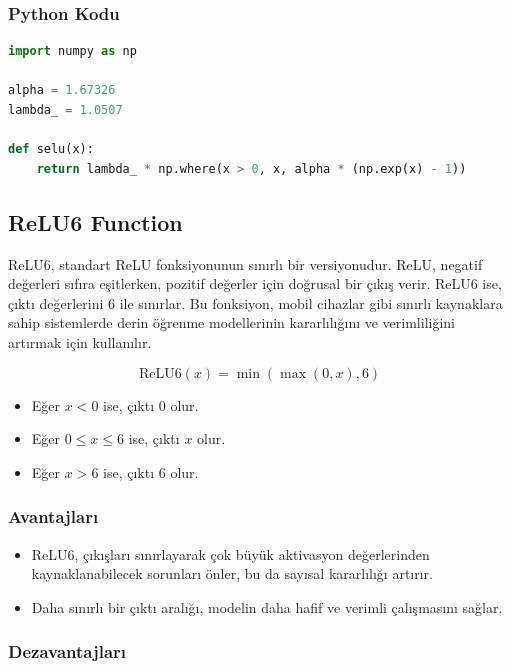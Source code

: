 \subsubsection{Python Kodu}

\begin{lstlisting}[language=Python]
import numpy as np

alpha = 1.67326
lambda_ = 1.0507

def selu(x):
    return lambda_ * np.where(x > 0, x, alpha * (np.exp(x) - 1))
\end{lstlisting}

\newpage

\subsection{ReLU6 Function}

ReLU6, standart ReLU fonksiyonunun sınırlı bir versiyonudur. ReLU, negatif değerleri sıfıra eşitlerken, pozitif değerler için doğrusal bir çıkış verir. ReLU6 ise, çıktı değerlerini 6 ile sınırlar. Bu fonksiyon, mobil cihazlar gibi sınırlı kaynaklara sahip sistemlerde derin öğrenme modellerinin kararlılığını ve verimliliğini artırmak için kullanılır.

\[ \text{ReLU6}(x) = \min(\max(0, x), 6) \]

\begin{itemize}
    \item Eğer $x < 0$ ise, çıktı 0 olur.
    \item Eğer $0 \leq x \leq 6$ ise, çıktı $x$ olur.
    \item Eğer $x > 6$ ise, çıktı 6 olur.
\end{itemize}

\subsubsection{Avantajları}

\begin{itemize}
    \item ReLU6, çıkışları sınırlayarak çok büyük aktivasyon değerlerinden kaynaklanabilecek sorunları önler, bu da sayısal kararlılığı artırır.
    \item Daha sınırlı bir çıktı aralığı, modelin daha hafif ve verimli çalışmasını sağlar.
\end{itemize}

\subsubsection{Dezavantajları}

